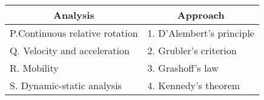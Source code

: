 \begin{tabular}{|l|l|}
\hline
\multicolumn{1}{|c|}{\textbf{Analysis}}    & \multicolumn{1}{|c|}{\textbf{Approach}} \\
\hline
P.Continuous relative rotation     & 1. D'Alembert's principle \\
\hline
Q. Velocity and acceleration         &2. Grubler's criterion \\
\hline
R. Mobility               &3. Grashoff's law\\
\hline
S. Dynamic-static analysis            &4. Kennedy's theorem\\
\hline
\end{tabular}